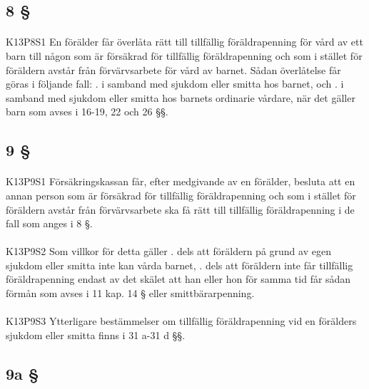 \documentclass[a4paper,notitlepage,openany,10pt]{book}
\begin{document}
\subsection*{8 §}
\paragraph*{}
{\tiny K13P8S1}
En förälder får överlåta rätt till tillfällig föräldrapenning för vård av ett barn till någon som är försäkrad för tillfällig föräldrapenning och som i stället för föräldern avstår från förvärvsarbete för vård av barnet.
Sådan överlåtelse får göras i följande fall:
. i samband med sjukdom eller smitta hos barnet, och
. i samband med sjukdom eller smitta hos barnets ordinarie vårdare, när det gäller barn som avses i 16-19, 22 och 26 §§.
\subsection*{9 §}
\paragraph*{}
{\tiny K13P9S1}
Försäkringskassan får, efter medgivande av en förälder, besluta att en annan person som är försäkrad för tillfällig föräldrapenning och som i stället för föräldern avstår från förvärvsarbete ska få rätt till tillfällig föräldrapenning i de fall som anges i 8 §.
\paragraph*{}
{\tiny K13P9S2}
Som villkor för detta gäller
. dels att föräldern på grund av egen sjukdom eller smitta inte kan vårda barnet,
. dels att föräldern inte får tillfällig föräldrapenning endast av det skälet att han eller hon för samma tid får sådan förmån som avses i 11 kap. 14 § eller smittbärarpenning.
\paragraph*{}
{\tiny K13P9S3}
Ytterligare bestämmelser om tillfällig föräldrapenning vid en förälders sjukdom eller smitta finns i 31 a-31 d §§.
\subsection*{9a §}
\end{document}
